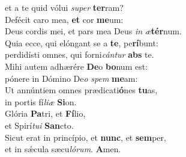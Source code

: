 \evenverse et a te quid vólui \textit{su}\textit{per} \textbf{ter}ram?\\
\oddverse Defécit caro mea, \textbf{et} cor \textbf{me}um:~\*\\
\oddverse Deus cordis mei, et pars mea Deus \textit{in} \textit{æ}\textbf{tér}num.\\
\evenverse Quia ecce, qui elóngant se a \textbf{te}, pe\textbf{rí}bunt:~\*\\
\evenverse perdidísti omnes, qui forni\textit{cán}\textit{tur} \textbf{abs} te.\\
\oddverse Mihi autem adhærére \textbf{De}o \textbf{bo}num est:~\*\\
\oddverse pónere in Dómino De\textit{o} \textit{spem} \textbf{me}am:\\
\evenverse Ut annúntiem omnes prædicati\textbf{ó}nes \textbf{tu}as,~\*\\
\evenverse in portis fí\textit{li}\textit{æ} \textbf{Si}on.\\
\oddverse Glória \textbf{Pa}tri, et \textbf{Fí}lio,~\*\\
\oddverse et Spirí\textit{tu}\textit{i} \textbf{San}cto.\\
\evenverse Sicut erat in princípio, et \textbf{nunc}, et \textbf{sem}per,~\*\\
\evenverse et in sǽcula sæcu\textit{ló}\textit{rum}. \textbf{A}men.\\
